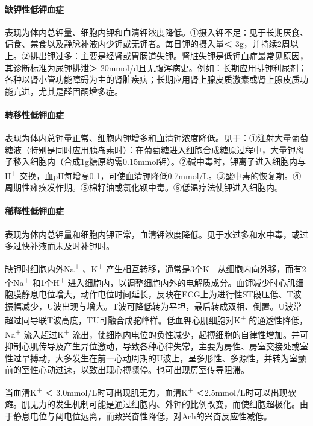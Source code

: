 \paragraph{缺钾性低钾血症}

表现为体内总钾量、细胞内钾和血清钾浓度降低。①摄入钾不足：见于长期厌食、偏食、禁食以及静脉补液内少钾或无钾者。每日钾的摄入量＜
3g，并持续2周以上。②排出钾过多：主要是经肾或胃肠道失钾。肾脏失钾是低钾血症最常见原因，其诊断标准为尿钾排泄＞
20mmol/d且无腹泻病史。例如：长期应用排钾利尿剂；各种以肾小管功能障碍为主的肾脏疾病；长期应用肾上腺皮质激素或肾上腺皮质功能亢进，尤其是醛固酮增多症。

\paragraph{转移性低钾血症}

表现为体内总钾量正常、细胞内钾增多和血清钾浓度降低。见于：①注射大量葡萄糖液（特别是同时应用胰岛素时）：在葡萄糖进入细胞合成糖原过程中，大量钾离子移入细胞内（合成1g糖原约需0.15mmol钾）。②碱中毒时，钾离子进入细胞内与H\textsuperscript{+}
交换，血pH每增高0.1，可使血清钾降低0.7mmol/L。③酸中毒的恢复期。④周期性瘫痪发作期。⑤棉籽油或氯化钡中毒。⑥低温疗法使钾进入细胞内。

\paragraph{稀释性低钾血症}

表现为体内总钾量和细胞内钾正常，血清钾浓度降低。见于水过多和水中毒，或过多过快补液而未及时补钾时。

缺钾时细胞内外Na\textsuperscript{+} 、K\textsuperscript{+}
产生相互转移，通常是3个K\textsuperscript{+}
从细胞内向外移，而有2个Na\textsuperscript{+} 和1个H\textsuperscript{+}
进入细胞内，以调整细胞内外的电解质成分。血钾减少时心肌细胞膜静息电位增大，动作电位时间延长，反映在ECG上为进行性ST段压低、T波振幅减少，U波出现与增大。T波可降低转为平坦，最后转成双相、倒置。U波常超过同导联T波高度，TU可融合成驼峰样。低血钾心肌细胞对K\textsuperscript{+}
的通透性降低，Na\textsuperscript{+} 流入超过K\textsuperscript{+}
流出，使细胞内电位的负性减少，起搏细胞的自律性增加。并可抑制心肌传导及产生异位激动，导致各种心律失常，主要为房性、房室交接处或室性过早搏动，大多发生在前一心动周期的U波上，呈多形性、多源性，并转为室颤前的室性心动过速，以致出现心搏骤停。也可出现房室传导阻滞。

当血清K\textsuperscript{+} ＜
3.0mmol/L时可出现肌无力，血清K\textsuperscript{+}
＜2.5mmol/L时可以出现软瘫。肌无力的发生机制可能是通过细胞内、外钾的比例改变，而使细胞超极化。由于静息电位与阈电位远离，而致兴奋性降低，对Ach的兴奋反应性减低。

